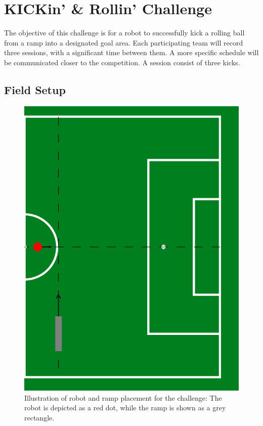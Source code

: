 \section{KICKin' \& Rollin' Challenge}

The objective of this challenge is for a robot to successfully kick a rolling ball from a ramp into a designated goal area. 
Each participating team will record three sessions, with a significant time between them.
A more specific schedule will be communicated closer to the competition.
A session consist of three kicks. 

\subsection{Field Setup}

\begin{figure}[t]
    \centerline{\includegraphics[width=\columnwidth/2]{figs/KICKin-Rollin-Placement-figure.png}}
    \caption{Illustration of robot and ramp placement for the challenge: The robot is depicted as a red dot, while the ramp is shown as a grey rectangle.}
    \label{fig:KICKin-Rolling-Challenge}
\end{figure}

